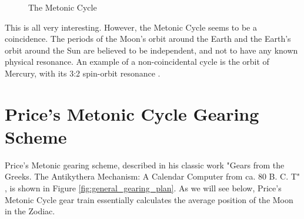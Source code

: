 \documentclass{article}
\theoremstyle{definition}
\begin{document}
\medskip
\begin{figure}[H]
  \caption{The Metonic Cycle \cite{youtube:freeth2021}}
  \label{fig:metonic_cycle}
\end{figure}

\bigskip
\noindent
This is all very interesting. However, the Metonic Cycle seems to
be a coincidence. The periods of the Moon's orbit around the
Earth and the Earth's orbit around the Sun are believed to be
independent, and not to have any known physical resonance. An
example of a non-coincidental cycle is the orbit of Mercury, with
its 3:2 spin-orbit resonance \cite{Correia2004}.

\section{Price's Metonic Cycle Gearing Scheme}
Price's Metonic gearing scheme, described in his classic work
"Gears from the Greeks. The Antikythera Mechanism: A Calendar
Computer from ca. 80 B. C. T" \cite{gears_from_the_greeks}, is
shown in Figure \ref{fig:general_gearing_plan}. As we will see
below, Price's Metonic Cycle gear train essentially calculates
the average position of the Moon in the Zodiac.
\end{document}

